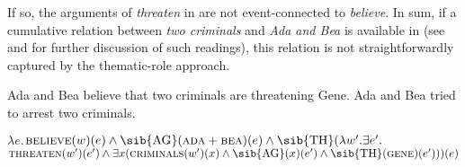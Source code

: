 \documentclass[output=paper]{langscibook}
\begin{document}
{%
} If so, the arguments of \textit{threaten} in  are not event-connected to \textit{believe}. In sum, if a cumulative relation between \textit{two criminals} and \textit{Ada and Bea} is available in  (see \citealt{Pasternak:2018} and \citealt{Schmitt:2020} for further discussion of such readings), this relation is not straightforwardly captured by the thematic-role approach.

\ea
\ea \label{has-sch:questi-dd}  Ada and Bea believe that two criminals are threatening Gene.
\ex  \label{has-sch:questi-aa} Ada and Bea tried to arrest two criminals.
\z\z

\ea
\label{has-sch:believe-formula}$\lambda e.$\sib{*}$\textsc{believe}(w)(e) \land \text{\sib{AG}}(\textsc{ada}+\textsc{bea})(e) \land \text{\sib{TH}}(\lambda w'.\exists e'.$\sib{*}$\textsc{threaten}(w')(e') \land \exists x(\textsc{criminals}(w')(x) \land \text{\sib{AG}}(x)(e') \land \text{\sib{TH}}(\textsc{gene})(e')))(e)$
\z
\end{document}
